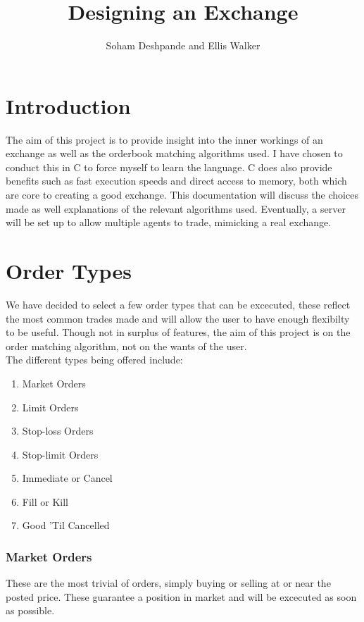\documentclass[12pt]{article}
\begin{document}
\title{Designing an Exchange}
\author{Soham Deshpande and Ellis Walker}
\maketitle
\clearpage

\tableofcontents

\clearpage
\section{Introduction}
The aim of this project is to provide insight into the inner workings of an 
exchange as well as the orderbook matching algorithms used. I have chosen
to conduct this in C to force myself to learn the language. C does also provide
benefits such as fast execution speeds and direct access to memory, both which
are core to creating a good exchange. This documentation will discuss the 
choices made as well explanations of the relevant algorithms used. Eventually,
a server will be set up to allow multiple agents to trade, mimicking a real
exchange. 
  

\section{Order Types}
We have decided to select a few order types that can be excecuted, these reflect
the most common trades made and will allow the user to have enough flexibilty
to be useful. Though not in surplus of features, the aim of this project is on
the order matching algorithm, not on the wants of the user.
\\
The different types being offered include:
\begin{enumerate}
  \item Market Orders
  \item Limit Orders
  \item Stop-loss Orders
  \item Stop-limit Orders
  \item Immediate or Cancel
  \item Fill or Kill
  \item Good 'Til Cancelled
\end{enumerate}

\subsubsection{Market Orders}
These are the most trivial of orders, simply buying or selling at or near the 
posted price. These guarantee a position in market and will be excecuted as 
soon as possible. 
\end{document}
